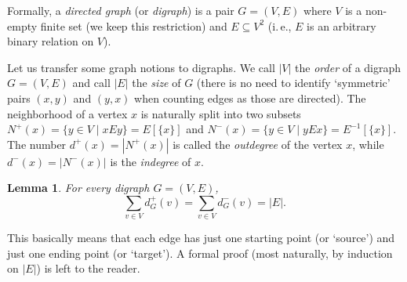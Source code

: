 \documentclass[12pt,notitlepage]{article}
\theoremstyle{plain}
\newtheorem{lemma}[thm]{Lemma}
\theoremstyle{definition}
\theoremstyle{plain}
\newcommand{\sbs}{\subseteq}
\newcommand{\1}{\mathbf{1}}
\newcommand{\0}{\mathbf{0}}
\begin{document}
Formally, a \emph{directed graph} (or \emph{digraph}) is a pair $G = (V, E)$ where $V$ is a non-empty finite set (we keep this restriction) and $E \sbs V^2$ (i.\,e., $E$ is an arbitrary binary relation on $V$).

Let us transfer some graph notions to digraphs. We call $|V|$ the \emph{order} of a digraph $G = (V, E)$ and call $|E|$ the \emph{size} of $G$ (there is no need to identify `symmetric' pairs $(x,y)$ and $(y,x)$ when counting edges as those are directed). The neighborhood of a vertex $x$ is naturally split into two subsets $N^+(x) = \{ y \in V \mid x E y \} = E[\{ x\}]$ and $N^-(x) = \{ y \in V \mid y E x \} = E^{-1}[\{x\}]$. The number $d^+(x) = |N^+(x)|$ is called the \emph{outdegree} of the vertex $x$, while $d^-(x) = |N^-(x)|$ is the \emph{indegree} of $x$.

\begin{lemma}
For every digraph $G = (V, E)$,
$$\sum_{v \in V} d^+_G(v) = \sum_{v \in V} d^-_G(v) = |E|.$$  
\end{lemma}
This basically means that each edge has just one starting point (or `source') and just one ending point (or `target'). A formal proof (most naturally, by induction on $|E|$) is left to the reader.

\newpage
\end{document}
